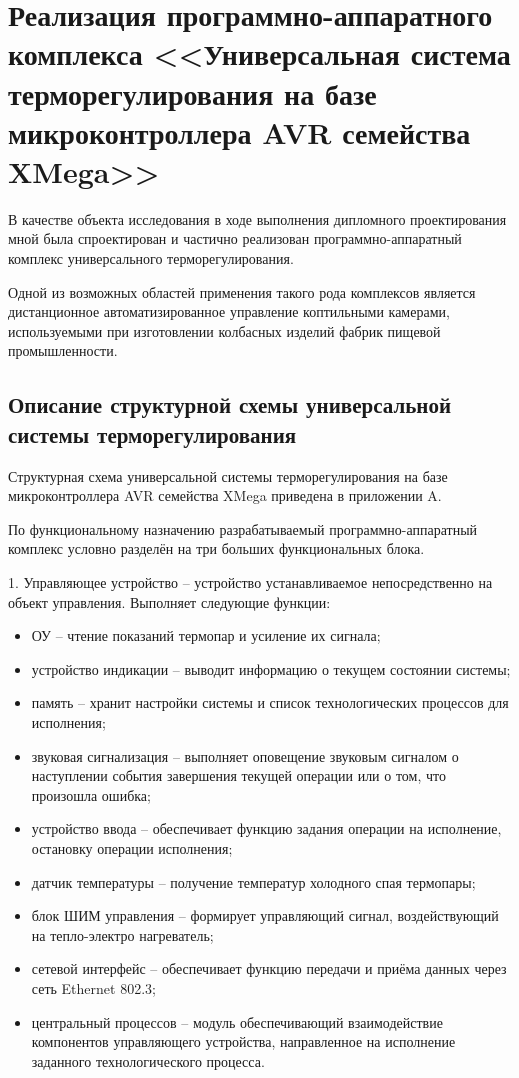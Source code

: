 \section{Реализация программно-аппаратного комплекса <<Универсальная система
терморегулирования на базе микроконтроллера AVR семейства XMega>>}
В качестве объекта исследования в ходе выполнения дипломного проектирования мной
была спроектирован и частично реализован программно-аппаратный комплекс
универсального терморегулирования.

Одной из возможных областей применения такого рода комплексов является дистанционное
автоматизированное управление коптильными камерами, используемыми при изготовлении
колбасных изделий фабрик пищевой промышленности.

\subsection{Описание структурной схемы универсальной системы терморегулирования}
Структурная схема универсальной системы терморегулирования на базе микроконтроллера
AVR семейства XMega приведена в приложении A.

По функциональному назначению разрабатываемый программно-аппаратный комплекс условно
разделён на три больших функциональных блока.

\begin{par}
	1.	Управляющее устройство -- устройство устанавливаемое непосредственно
	на объект управления. Выполняет следующие функции:
		\begin{itemize}
			\item{} ОУ -- чтение показаний термопар и усиление их сигнала;
			\item{} устройство индикации -- выводит информацию о текущем состоянии системы;
			\item{} память -- хранит настройки системы и список технологических процессов для
				исполнения;
			\item{} звуковая сигнализация -- выполняет оповещение звуковым сигналом о
				наступлении события завершения текущей операции или о том, что произошла ошибка;
			\item{} устройство ввода -- обеспечивает функцию задания операции на исполнение,
				остановку операции исполнения;
			\item{} датчик температуры -- получение температур холодного спая термопары;
			\item{} блок ШИМ управления -- формирует управляющий сигнал, воздействующий на
				тепло-электро нагреватель;
			\item{} сетевой интерфейс -- обеспечивает функцию передачи и приёма данных
				через сеть Ethernet 802.3;
			\item{} центральный процессов -- модуль обеспечивающий взаимодействие компонентов
				управляющего устройства, направленное на исполнение заданного технологического
				процесса.
		\end{itemize}
\end{par}

